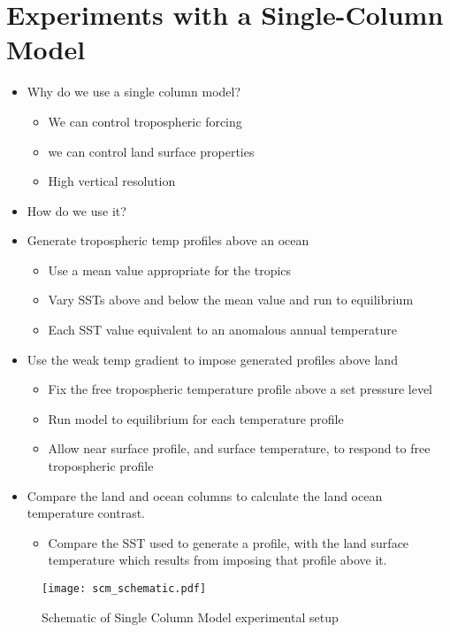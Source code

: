 \section{Experiments with a Single-Column Model}
\label{mech_scm}
\begin{itemize}
	\item Why do we use a single column model?
		\begin{itemize}
			\item We can control tropospheric forcing
			\item we can control land surface properties
			\item High vertical resolution
		\end{itemize}
	\item How do we use it?
	\item Generate tropospheric temp profiles above an ocean
		\begin{itemize}
			\item Use a mean value appropriate for the tropics
			\item Vary SSTs above and below the mean value and run to 
				equilibrium
			\item Each SST value equivalent to an anomalous annual temperature
			\end{itemize}
		\item Use the weak temp gradient to impose generated profiles above land
		\begin{itemize}
			\item Fix the free tropospheric temperature profile above a set 
			pressure level
		\item Run model to equilibrium for each temperature profile
		\item Allow near surface profile, and surface temperature, to 
			respond to free tropospheric profile
		\end{itemize}
	\item Compare the land and ocean columns to calculate the land ocean 
		temperature contrast.
		\begin{itemize}
			\item Compare the SST used to generate a profile, with the land 
				surface temperature which results from imposing that profile 
				above it.
		\end{itemize}
	\end{itemize}

\begin{figure}[ht]
\texttt{[image: scm\_schematic.pdf]}
\caption{Schematic of Single Column Model experimental setup}
\label{fig:scmschem}
\end{figure}


